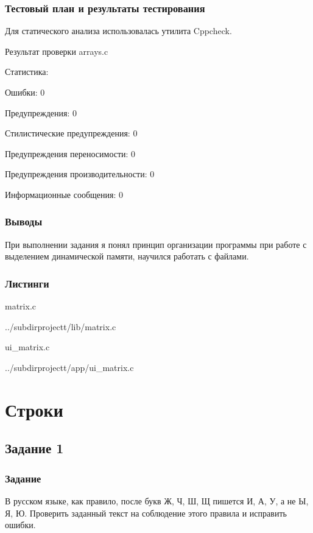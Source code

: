 \documentclass[12pt,a4paper]{report}
\begin{document}
\subsection{Тестовый план и результаты тестирования}

Для статического анализа использовалась утилита Cppcheck.

\vspace{\baselineskip}
Результат проверки arrays.c 

Статистика:

Ошибки:	0

Предупреждения:	0

Стилистические предупреждения:	0

Предупреждения переносимости:	0

Предупреждения производительности:	0

Информационные сообщения:	0

\subsection{Выводы}

При выполнении задания я понял принцип организации программы при работе с выделением динамической памяти, научился работать с файлами.

\subsection*{Листинги}

matrix.c

{../subdirprojectt/lib/matrix.c}

\vspace{\baselineskip}

ui_matrix.c

{../subdirprojectt/app/ui_matrix.c}

\chapter{Строки}
\section{Задание 1}
\subsection{Задание}

В русском языке, как правило, после букв Ж, Ч, Ш, Щ пишется И, А, У, а не Ы, Я, Ю. Проверить заданный текст на соблюдение этого правила и исправить ошибки.
\end{document}

